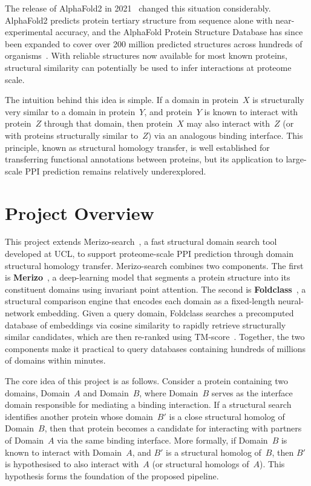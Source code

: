 The release of AlphaFold2 in 2021~\cite{alphafold2} changed this situation considerably.
AlphaFold2 predicts protein tertiary structure from sequence alone with near-experimental accuracy, and the AlphaFold Protein Structure Database has since been expanded to cover over 200 million predicted structures across hundreds of organisms~\cite{ted_dataset}.
With reliable structures now available for most known proteins, structural similarity can potentially be used to infer interactions at proteome scale.

The intuition behind this idea is simple.
If a domain in protein~$X$ is structurally very similar to a domain in protein~$Y$, and protein~$Y$ is known to interact with protein~$Z$ through that domain, then protein~$X$ may also interact with~$Z$ (or with proteins structurally similar to~$Z$) via an analogous binding interface.
This principle, known as structural homology transfer, is well established for transferring functional annotations between proteins, but its application to large-scale PPI prediction remains relatively underexplored.


\section{Project Overview}
\label{sec:intro-overview}

This project extends Merizo-search~\cite{merizo_search}, a fast structural domain search tool developed at UCL, to support proteome-scale PPI prediction through domain structural homology transfer.
Merizo-search combines two components.
The first is \textbf{Merizo}~\cite{merizo}, a deep-learning model that segments a protein structure into its constituent domains using invariant point attention.
The second is \textbf{Foldclass}~\cite{merizo_search}, a structural comparison engine that encodes each domain as a fixed-length neural-network embedding.
Given a query domain, Foldclass searches a precomputed database of embeddings via cosine similarity to rapidly retrieve structurally similar candidates, which are then re-ranked using TM-score~\cite{tmalign}.
Together, the two components make it practical to query databases containing hundreds of millions of domains within minutes.

The core idea of this project is as follows.
Consider a protein containing two domains, Domain~$A$ and Domain~$B$, where Domain~$B$ serves as the interface domain responsible for mediating a binding interaction.
If a structural search identifies another protein whose domain~$B'$ is a close structural homolog of Domain~$B$, then that protein becomes a candidate for interacting with partners of Domain~$A$ via the same binding interface.
More formally, if Domain~$B$ is known to interact with Domain~$A$, and $B'$ is a structural homolog of~$B$, then $B'$ is hypothesised to also interact with~$A$ (or structural homologs of~$A$).
This hypothesis forms the foundation of the proposed pipeline.

